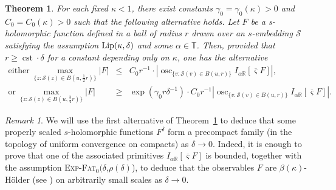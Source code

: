 \documentclass[reqno]{amsart}
\numberwithin{equation}{section}
\newtheorem{theorem}{Theorem}[section]
\theoremstyle{definition}
\theoremstyle{remark}
\newtheorem{rem}[theo]{Remark}
\newcommand\R{\mathbb{R}}
\newcommand\cst{\operatorname{cst}}
\newcommand\osc{\operatorname{osc}}
\newcommand\cS{\mathcal{S}}
\def\ExpFat{{{\mbox{\textsc{Exp-Fat}$_0(\delta$\textsc{,}$\rho(\delta)$\textsc{)}}}}}
\begin{document}
\begin{theorem}{\cite[Theorem 6.17]{CLR1}} \label{thm:F-via-HF} For each fixed $\kappa<1$, there exist constants $\gamma_0=\gamma_0(\kappa)>0$ and \mbox{$C_0=C_0(\kappa)>0$} such that the following alternative holds. Let $F$ be a s-holomorphic function defined in a ball of radius $r$ drawn over an $s$-embedding $\cS$ satisfying the assumption $\textup{Lip}(\kappa,\delta)$ and some $\alpha \in \mathbb{T}$. Then, provided that $r\ge\cst\cdot\delta$ for a constant depending only on $\kappa$, one has the alternative
\[
\begin{array}{rcl}
\text{either}\ \max_{\{z:\cS(z)\in B(u,\frac{1}{2}r)\}}|F|&\le& C_0r^{-1}\cdot |\osc_{\{v:\cS(v)\in B(u,r)\}}I_{\alpha\R}[\overline{\varsigma}F]|,\\[4pt]
\text{or}\ \max_{\{z:\cS(z)\in B(u,\frac{3}{4}r)\}}|F|&\ge& \exp(\gamma_0r\delta^{-1})\cdot C_0r^{-1}|\osc_{\{v:\cS(v)\in B(u,r)\}}I_{\alpha\R}[\overline{\varsigma}F]|.
\end{array}
\]

\end{theorem}


\begin{rem}\label{rem:regularity}
We will use the first alternative of Theorem~\ref{thm:F-via-HF} to deduce that some properly scaled $s$-holomorphic functions $F^\delta$ form a precompact family (in the topology of uniform convergence on compacts) as $\delta \to 0$. Indeed, it is enough to prove that one of the associated primitives $I_{\alpha \mathbb{R}}[\overline{\varsigma} F]$ is bounded, together with the assumption \ExpFat, to deduce that the observables $F$ are $\beta(\kappa)$-Hölder (see \cite[Theorem~2.18]{Che20}) on arbitrarily small scales as $\delta \to 0$.\end{rem}
\end{document}
